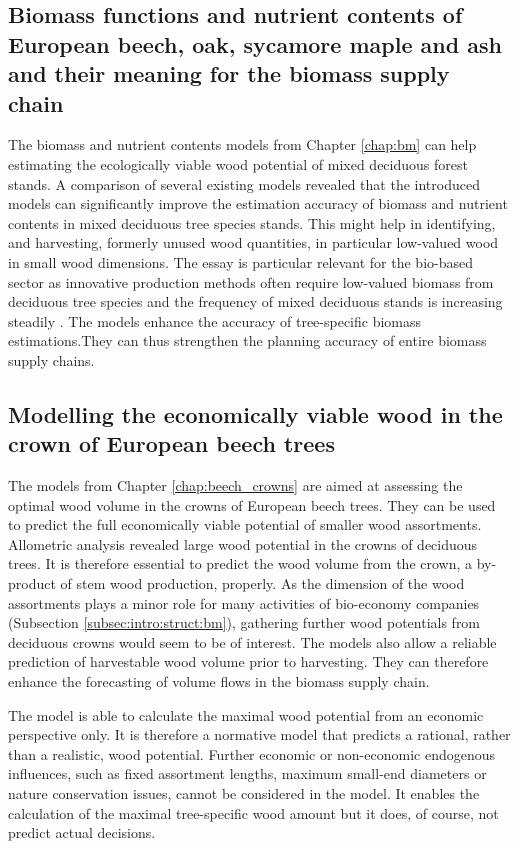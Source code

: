 \subsection{Biomass functions and nutrient contents of European beech, oak, sycamore maple and ash and their meaning for the biomass supply chain}
\label{subsec:discussion:struct:bm}
The biomass and nutrient contents models from Chapter \ref{chap:bm} can help estimating the ecologically viable wood potential of mixed deciduous forest stands. A comparison of several existing models revealed that the introduced models can significantly improve the estimation accuracy of biomass and nutrient contents in mixed deciduous tree species stands. This might help in identifying, and harvesting, formerly unused wood quantities, in particular low-valued wood in small wood dimensions. The essay is particular relevant for the bio-based sector as innovative production methods often require low-valued biomass from deciduous tree species \citep[p. 1]{auer_2016} and the frequency of mixed deciduous stands is increasing steadily \citep{ti_2014}. The models enhance the accuracy of tree-specific biomass estimations.They can thus strengthen the planning accuracy of entire biomass supply chains.

\subsection{Modelling the economically viable wood in the crown of European beech trees}
\label{subsec:discussion:struct:beech_crowns}
The models from Chapter \ref{chap:beech_crowns} are aimed at assessing the optimal wood volume in the crowns of European beech trees. They can be used to predict the full economically viable potential of smaller wood assortments. Allometric analysis revealed large wood potential in the crowns of deciduous trees. It is therefore essential to predict the wood volume from the crown, a by-product of stem wood production, properly. As the dimension of the wood assortments plays a minor role for many activities of bio-economy companies (Subsection \ref{subsec:intro:struct:bm}), gathering further wood potentials from deciduous crowns would seem to be of interest. The models also allow a reliable prediction of harvestable wood volume prior to harvesting. They can therefore enhance the forecasting of volume flows in the biomass supply chain.

The model is able to calculate the maximal wood potential from an economic perspective only. It is therefore a normative model that predicts a rational, rather than a realistic, wood potential. Further economic or non-economic endogenous influences, such as fixed assortment lengths, maximum small-end diameters or nature conservation issues, cannot be considered in the model. It enables the calculation of the maximal tree-specific wood amount but it does, of course, not predict actual decisions.

